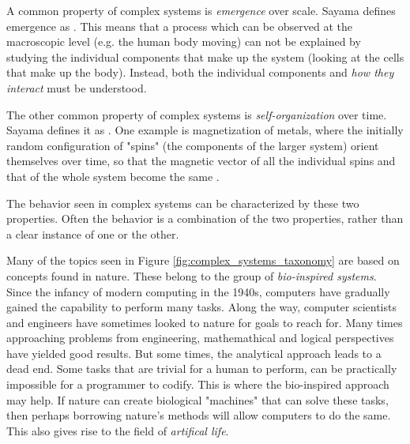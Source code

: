 A common property of complex systems is \textit{emergence} over scale.
Sayama defines emergence as .
This means that a process which can be observed at the macroscopic level (e.g. the human body moving) can not be explained by studying the individual components that make up the system (looking at the cells that make up the body).
Instead, both the individual components and \textit{how they interact} must be understood.

The other common property of complex systems is \textit{self-organization} over time.
Sayama defines it as .
One example is magnetization of metals, where the initially random configuration of "spins" (the components of the larger system) orient themselves over time,
so that the magnetic vector of all the individual spins and that of the whole system become the same \cite{heylighen2001science}.

The behavior seen in complex systems can be characterized by these two properties.
Often the behavior is a combination of the two properties, rather than a clear instance of one or the other.

Many of the topics seen in Figure \ref{fig:complex_systems_taxonomy} are based on concepts found in nature.
These belong to the group of \textit{bio-inspired systems}.
Since the infancy of modern computing in the 1940s, computers have gradually gained the capability to perform many tasks.
Along the way, computer scientists and engineers have sometimes looked to nature for goals to reach for.
Many times approaching problems from engineering, mathemathical and logical perspectives have yielded good results.
But some times, the analytical approach leads to a dead end.
Some tasks that are trivial for a human to perform, can be practically impossible for a programmer to codify.
This is where the bio-inspired approach may help.
If nature can create biological "machines" that can solve these tasks, then perhaps borrowing nature's methods will allow computers to do the same.
This also gives rise to the field of \textit{artifical life}.

